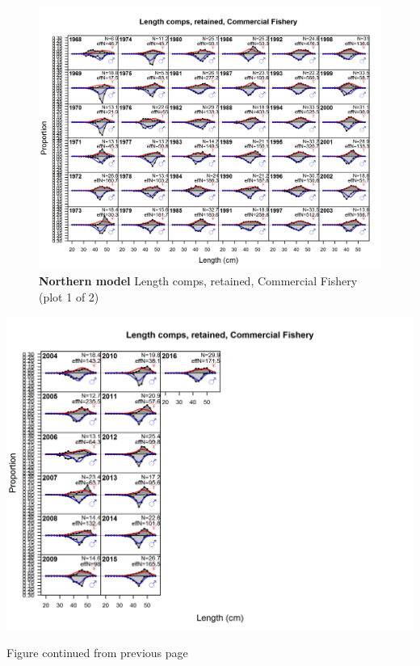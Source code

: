 \documentclass[12pt,]{article}
\begin{document}
\FloatBarrier

\newpage

\begin{figure}[htbp]
\centering
\includegraphics{./r4ss/plots_mod1/comp_lenfit_flt1mkt2_page1.png}
\caption{\textbf{Northern model} Length comps, retained, Commercial
Fishery (plot 1 of 2) \label{fig:mod1_1_comp_lenfit_flt1mkt2_page1}}
\end{figure}

\includegraphics{./r4ss/plots_mod1/comp_lenfit_flt1mkt2_page2.png}

\begin{center} 

            Figure continued from previous page 

            \end{center}
\end{document}
